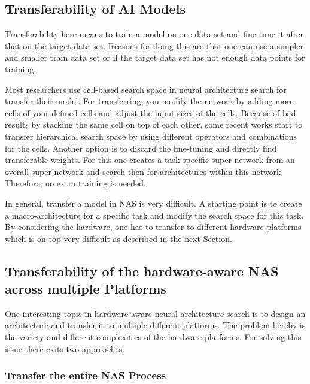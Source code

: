 \documentclass[conference]{IEEEtran}
\begin{document}
\subsection{Transferability of AI Models}

Transferability here means to train a model on one data set and fine-tune it after that on the target data set. Reasons for doing this are that one can use a simpler and smaller train data set or if the target data set has not enough data points for training. 

Most researchers use cell-based search space in neural architecture search for transfer their model. For transferring, you modify the network by adding more cells of your defined cells and adjust the input sizes of the cells. Because of bad results by stacking the same cell on top of each other, some recent works start to transfer hierarchical search space by using different operators and combinations for the cells. Another option is to discard the fine-tuning and directly find transferable weights. For this one creates a task-specific super-network from an overall super-network and search then for architectures within this network. Therefore, no extra training is needed. 

In general, transfer a model in NAS is very difficult. A starting point is to create a macro-architecture for a specific task and modify the search space for this task. By considering the hardware, one has to transfer to different hardware platforms which is on top very difficult as described in the next Section. 
 
\subsection{Transferability of the hardware-aware NAS across multiple Platforms}

One interesting topic in hardware-aware neural architecture search is to design an architecture and transfer it to multiple different platforms. The problem hereby is the variety and different complexities of the hardware platforms. For solving this issue there exits two approaches.

\subsubsection{Transfer the entire NAS Process}
\end{document}
